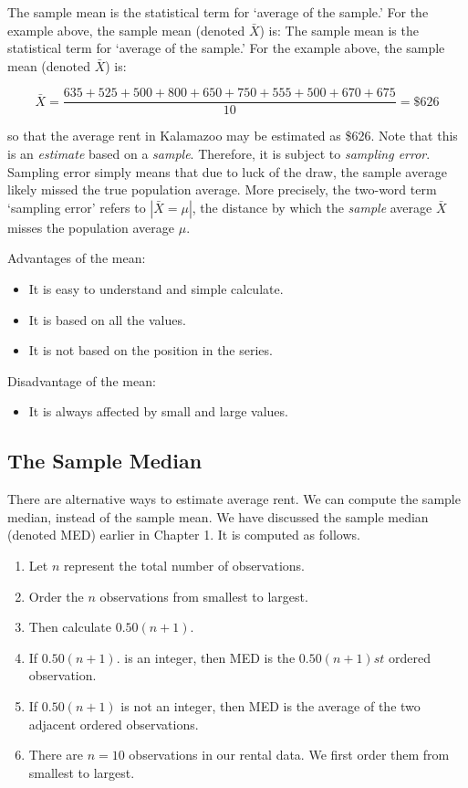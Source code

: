 \documentclass[11pt, chapterprefix=true]{scrbook}\usepackage[]{graphicx}\usepackage[]{color}
\begin{document}
The sample mean is the statistical term for `average of the sample.'  For the example above, the sample mean (denoted $\bar{X}$) is: The sample mean is the statistical term for `average of the sample.'  For the example above, the sample mean (denoted $\bar{X}$) is:

$$ \bar{X} = \frac{635+525+500+800+650+750+555+500+670+675}{10} = \$626 $$

so that the average rent in Kalamazoo may be estimated as \$626.  Note that this is an \textit{estimate} based on a \textit{sample}.  Therefore, it is subject to \textit{sampling error}.   Sampling error simply means that due to luck of the draw, the sample average likely missed the true population average.  More precisely, the two-word term `sampling error' refers to $| \bar{X} = \mu |$,  the distance by which the \textit{sample} average $\bar{X}$  misses the population average  $\mu$.

Advantages of the mean:

\begin{itemize}
\item It is easy to understand and simple calculate.
\item It is based on all the values.
\item It is not based on the position in the series.
\end{itemize}

Disadvantage of the mean:

\begin{itemize}
\item It is always affected by small and large values.
\end{itemize}

\subsection{The Sample Median}

There are alternative ways to estimate average rent.  We can compute the sample
median, instead of the sample mean.  We have discussed the sample median (denoted MED) earlier in Chapter 1.  It is computed as follows.

\begin{enumerate}
\item Let $n$ represent the total number of observations.
\item Order the $n$ observations from smallest to largest.
\item Then calculate $0.50(n + 1)$.
\item If $0.50(n + 1)$. is an integer, then MED is the $0.50(n + 1)st$ ordered observation.
\item If $0.50(n + 1)$ is not an integer, then MED is the average of the two adjacent ordered observations.
\item There are $n = 10$ observations in our rental data.  We first order them from smallest to largest.
\end{enumerate}
\end{document}
